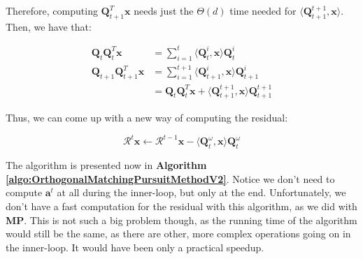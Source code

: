 \documentclass[12pt,a4paper,oneside,english]{UPBThesis}
\begin{document}
Therefore, computing $\textbf{Q}_{t+1}^T\textbf{x}$ needs just the $\Theta(d)$ time needed for $\langle \textbf{Q}_{t+1}^{t+1}, \textbf{x} \rangle$. Then, we have that:

\begin{align*}
\textbf{Q}_t\textbf{Q}_t^T\textbf{x} & = \sum_{i=1}^t {\langle \textbf{Q}_t^i, \textbf{x} \rangle \textbf{Q}_t^i} \\
\textbf{Q}_{t+1}\textbf{Q}_{t+1}^T\textbf{x} & = \sum_{i=1}^{t+1} {\langle \textbf{Q}_{t+1}^i, \textbf{x} \rangle \textbf{Q}_{t+1}^i} \\
& = \textbf{Q}_t\textbf{Q}_t^T\textbf{x} + \langle \textbf{Q}_{t+1}^{t+1}, \textbf{x} \rangle \textbf{Q}_{t+1}^{t+1}
\end{align*}

Thus, we can come up with a new way of computing the residual:

\begin{equation*}
\mathcal{R}^t\textbf{x} \gets \mathcal{R}^{t-1}\textbf{x} - \langle \textbf{Q}_{t}^{\omega}, \textbf{x} \rangle \textbf{Q}_{t}^{\omega}
\end{equation*}

The algorithm is presented now in \textbf{Algorithm \ref{algo:OrthogonalMatchingPursuitMethodV2}}. Notice we don't need to compute $\textbf{a}^t$ at all during the inner-loop, but only at the end. Unfortunately, we don't have a fast computation for the residual with this algorithm, as we did with \textbf{MP}. This is not such a big problem though, as the running time of the algorithm would still be the same, as there are other, more complex operations going on in the inner-loop. It would have been only a practical speedup.
\end{document}
